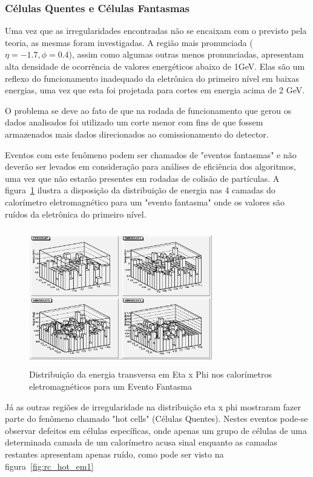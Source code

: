 \documentclass[a4paper,10pt,titlepage]{article}
\begin{document}
\subsubsection{Células Quentes e Células Fantasmas}

Uma vez que as irregularidades encontradas não se encaixam com o previsto pela teoria, as mesmas foram investigadas.
A região mais pronunciada ($\eta = -1.7, \phi = 0.4$), assim como algumas outras menos pronunciadas, apresentam alta densidade de ocorrência de valores energéticos abaixo de 1GeV.
Elas são um reflexo do funcionamento inadequado da eletrônica do primeiro nível em baixas energias, uma vez que esta foi projetada para cortes em energia acima de 2 GeV.

O problema se deve ao fato de que na rodada de funcionamento que gerou os dados analisados foi utilizado um corte menor com fins de que fossem armazenados mais dados direcionados ao comissionamento do detector.

Eventos com este fenômeno podem ser chamados de "eventos fantasmas" e não deverão ser levados em consideração para análises de eficiência dos algoritmos, uma vez que não estarão presentes em rodadas de colisão de partículas.
A figura~\ref{fig:rc_low_et} ilustra a disposição da distribuição de energia nas 4 camadas do calorímetro eletromagnético para um "evento fantasma" onde os valores são ruídos da eletrônica do primeiro nível.

\begin{figure}[htbp!]
 \centering
 \includegraphics[width=8cm,height=6cm]{Figs/cosmics/rc_low_et.eps}
 \caption{Distribuição da energia transversa em Eta x Phi nos calorímetros eletromagnéticos para um Evento Fantasma}
 \label{fig:rc_low_et}
\end{figure}

Já as outras regiões de irregularidade na distribuição eta x phi mostraram fazer parte do fenômeno chamado "hot cells" (Células Quentes).
Nestes eventos pode-se observar defeitos em células específicas, onde apenas um grupo de células de uma determinada camada de um calorímetro acusa sinal enquanto as camadas restantes apresentam apenas ruído, como pode ser visto na figura~\ref{fig:rc_hot_em1}
\end{document}
